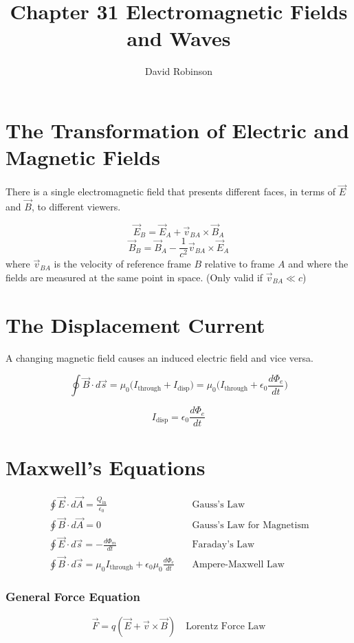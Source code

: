 \documentclass{article}
\title{Chapter 31 Electromagnetic Fields and Waves}
\author{David Robinson}
\date{}
\begin{document}
\maketitle

\section*{The Transformation of Electric and Magnetic Fields}
There is a single electromagnetic field that presents different faces, in terms of $\vec{E}$ and
$\vec{B}$, to different viewers.

\[\vec{E}_B = \vec{E}_A + \vec{v}_{BA}\times \vec{B}_A\]
\[\vec{B}_B = \vec{B}_A - \frac{1}{c^2}\vec{v}_{BA}\times \vec{E}_A\]
where $\vec{v}_{BA}$ is the velocity of reference frame $B$ relative to frame $A$ and where the
fields are measured at the same point in space. (Only valid if $\vec{v}_{BA} \ll c$)

\section*{The Displacement Current}
A changing magnetic field causes an induced electric field and vice versa.

\[\oint\vec{B}\cdot d \vec{s}=\mu_0 \Big(I_\text{through} + I_\text{disp}\Big) = \mu_0
\Big(I_\text{through} + \epsilon_0 \frac{d\Phi _ e}{dt}\Big)\]

\[I_\text{disp}=\epsilon_0 \frac{d\Phi_e}{dt}\]
\pagebreak

\section*{Maxwell's Equations}
\[\begin{aligned}
    \oint\vec{E}\cdot d\vec{A}=\frac{Q_\text{in}}{\epsilon_0}\quad & \text{Gauss's Law} \\ 
    \oint\vec{B}\cdot d\vec{A}=0\quad & \text{Gauss's Law for Magnetism} \\
    \oint\vec{E}\cdot d\vec{s} = -\frac{d\Phi_m}{dt}\quad & \text{Faraday's Law} \\ 
    \oint\vec{B}\cdot d\vec{s} = \mu_0 I_\text{through} + \epsilon_0 \mu_0 \frac{d\Phi_e}{dt}\quad
    & \text{Ampere-Maxwell Law}
\end{aligned}\]

\subsubsection*{General Force Equation}
\[\vec{F}=q(\vec{E} + \vec{v} \times \vec{B})\quad\text{Lorentz Force Law}\]
\end{document}
